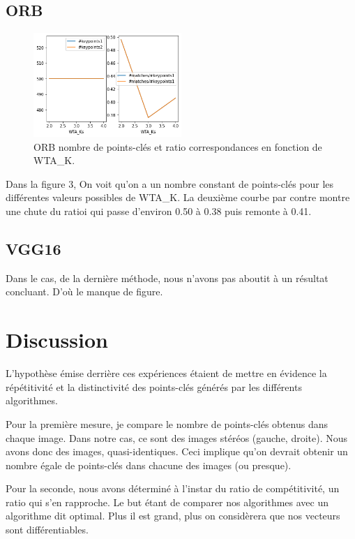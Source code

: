 \documentclass[conference]{IEEEtran}
\begin{document}
\subsection{ORB}

\begin{figure}[ht]
\centerline{\includegraphics[width=0.5\textwidth]{fig3.png}}
\caption{ORB nombre de points-clés et ratio correspondances en fonction de WTA\_K.}
\label{fig}
\end{figure}

Dans la figure 3, On voit qu'on a un nombre constant de points-clés pour les différentes valeurs possibles de WTA\_K. La deuxième courbe par contre montre une chute du ratioi qui passe d'environ 0.50 à 0.38 puis remonte à 0.41. \\

\subsection{VGG16}
Dans le cas, de la dernière méthode, nous n'avons pas aboutit à un résultat concluant. D'où le manque de figure.

\section{Discussion}

L'hypothèse émise derrière ces expériences étaient de mettre en évidence la répétitivité et la distinctivité des points-clés générés par les différents algorithmes. 

Pour la première mesure, je compare le nombre de points-clés obtenus dans chaque image. Dans notre cas, ce sont des images stéréos (gauche, droite). Nous avons donc des images, quasi-identiques. Ceci implique qu'on devrait obtenir un nombre égale de points-clés dans chacune des images (ou presque). 

Pour la seconde, nous avons déterminé à l'instar du ratio de compétitivité,  un ratio qui s'en rapproche. Le but étant de comparer nos algorithmes avec un algorithme dit optimal. Plus il est grand, plus on considèrera que nos vecteurs sont différentiables.
\end{document}

